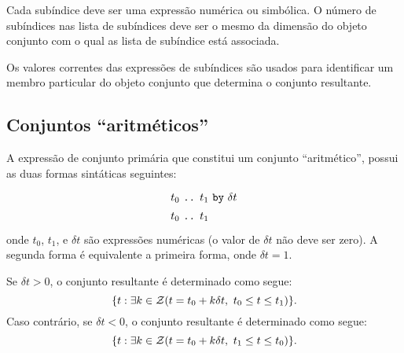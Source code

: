 \documentclass[11pt, brazil]{report}
\begin{document}
Cada subíndice deve ser uma expressão numérica ou simbólica. O número de
subíndices nas lista de subíndices deve ser o mesmo da dimensão do objeto
conjunto com o qual as lista de subíndice está associada.

Os valores correntes das expressões de subíndices são usados para identificar
um membro \linebreak particular do objeto conjunto que determina o conjunto resultante.

%

\subsection{Conjuntos ``aritméticos''}

A expressão de conjunto primária que constitui um conjunto ``aritmético'',
possui as duas formas sintáticas seguintes:
$$
{\def\arraystretch{1.4}
\begin{array}{l}
\mbox{$t_0$ {\tt..} $t_1$ {\tt by} $\delta t$}\\
\mbox{$t_0$ {\tt..} $t_1$}\\
\end{array}
}
$$
onde $t_0$, $t_1$, e $\delta t$ são expressões numéricas (o valor de
$\delta t$ não deve ser zero). A segunda forma é equivalente a primeira
forma, onde $\delta t=1$.

Se $\delta t>0$, o conjunto resultante é determinado como segue:
$$\{t:\exists k\in{\cal Z}(t=t_0+k\delta t,\ t_0\leq t\leq t_1)\}.$$
Caso contrário, se $\delta t<0$, o conjunto resultante é determinado como segue:
$$\{t:\exists k\in{\cal Z}(t=t_0+k\delta t,\ t_1\leq t\leq t_0)\}.$$
%
\end{document}
